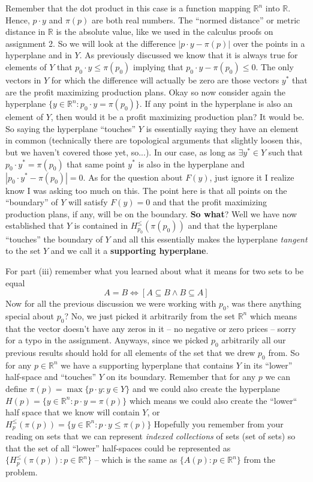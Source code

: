 \documentclass[a4paper,12pt]{article}
\begin{document}
Remember that the dot product in this case is a function mapping $\mathbb{R}^n$ into $\mathbb{R}$.
Hence, $p\cdot y$ and $\pi(p)$ are both real numbers.
The ``normed distance'' or metric distance in $\mathbb{R}$ is the absolute value, like we used in the calculus proofs on assignment 2.
So we will look at the difference $|p\cdot y - \pi(p)|$ over the points in a hyperplane and in $Y$.
As previously discussed we know that it is always true for elements of $Y$ that $p_0 \cdot y \leq \pi(p_0)$ implying that $p_0\cdot y  - \pi(p_0) \leq 0$.
The only vectors in $Y$ for which the difference will actually be zero are those vectors $y^*$ that are the profit maximizing production plans.
Okay so now consider again the hyperplane $\{ y \in \mathbb{R}^n: p_0 \cdot y = \pi(p_0)\}$.
If any point in the hyperplane is also an element of $Y$, then would it be a profit maximizing production plan? It would be.
So saying the hyperplane ``touches'' $Y$ is essentially saying they have an element in common (technically there are topological arguments that slightly loosen this, but we haven't covered those yet, so...).
In our case, as long as $\exists y^* \in Y$ such that $p_0\cdot y^* = \pi(p_0)$ that same point $y^*$ is also in the hyperplane and $|p_0 \cdot y^* - \pi(p_0)|=0$.
As for the question about $F(y)$, just ignore it I realize know I was asking too much on this.  The point here is that all points on the ``boundary'' of $Y$ will satisfy $F(y)=0$ and that the profit maximizing production plans, if any, will be on the boundary.
\textbf{So what}? Well we have now established that $Y$ is contained in $H_{p_0}^{\leq}(\pi(p_0))$ and that the hyperplane ``touches'' the boundary of $Y$ and all this essentially makes the hyperplane \emph{tangent} to the set $Y$ and we call it a \textbf{supporting hyperplane}.

For part (iii) remember what you learned about what it means for two sets to be equal
\[
  A = B \iff [A \subseteq B \wedge B \subseteq A]
\]
Now for all the previous discussion we were working with $p_0$, was there anything special about $p_0$?
No, we just picked it arbitrarily from the set $\mathbb{R}^n$ which means that the vector doesn't have any zeros in it -- no negative or zero prices -- sorry for a typo in the assignment.
Anyways, since we picked $p_0$ arbitrarily all our previous results should hold for all elements of the set that we drew $p_0$ from.
So for any $p \in \mathbb{R}^n$ we have a supporting hyperplane that contains $Y$ in its ``lower'' half-space and ``touches'' $Y$ on its boundary.
Remember that for any $p$ we can define $\pi(p) = \max\{p\cdot y: y \in Y\}$ and we could also create the hyperplane $H(p) = \{ y \in \mathbb{R}^n: p\cdot y = \pi(p)\}$ which means we could also create the ``lower`` half space that we know will contain $Y$, or $H_{p}^{\leq}(\pi(p))=\{ y \in \mathbb{R}^n : p\cdot y \leq \pi(p) \}$
Hopefully you remember from your reading on sets that we can represent \emph{indexed collections} of sets (set of sets) so that the set of all ``lower'' half-spaces could be represented as $\{ H_{p}^{\leq}(\pi(p)): p \in \mathbb{R}^n \}$ -- which is the same as $\{ A(p) : p \in \mathbb{R}^n\}$ from the problem.
\end{document}
